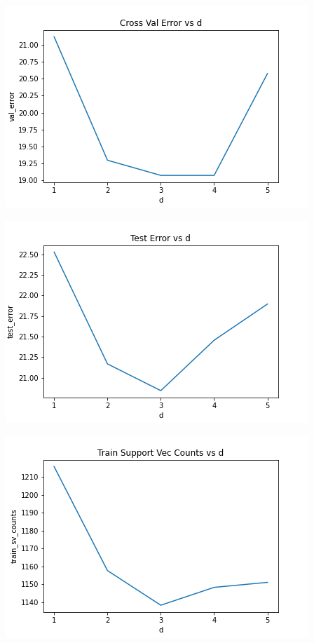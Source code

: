 \documentclass{article}
\begin{document}
\includegraphics[width=\textwidth]{./images/C4_cross_val_error_vs_d.png}

\includegraphics[width=\textwidth]{./images/C4_test_error_vs_d.png}

\includegraphics[width=\textwidth]{./images/C4_train_sv_counts.png}
\end{document}
